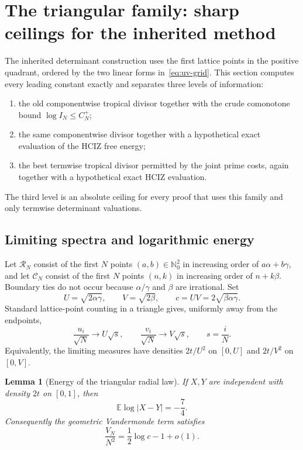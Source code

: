 \documentclass[11pt]{article}
\newcommand{\Nzero}{\mathbb N_0}
\newcommand{\E}{\mathbb E}
\newcommand{\1}{\mathbf 1}
\theoremstyle{plain}
\newtheorem{lemma}[theorem]{Lemma}
\theoremstyle{definition}
\theoremstyle{remark}
\begin{document}
\section{The triangular family: sharp ceilings for the inherited method}
\label{sec:triangular}

The inherited determinant construction uses the first lattice points in the
positive quadrant, ordered by the two linear forms in~\eqref{eq:uv-grid}.
This section computes every leading constant exactly and separates three
levels of information:
\begin{enumerate}[label=(\roman*),leftmargin=2.2em]
\item the old componentwise tropical divisor together with the crude
      comonotone bound $\log I_N\le C_N^+$;
\item the same componentwise divisor together with a hypothetical exact
      evaluation of the HCIZ free energy;
\item the best termwise tropical divisor permitted by the joint prime costs,
      again together with a hypothetical exact HCIZ evaluation.
\end{enumerate}
The third level is an absolute ceiling for every proof that uses this family
and only termwise determinant valuations.

\subsection{Limiting spectra and logarithmic energy}

Let $\mathcal R_N$ consist of the first $N$ points $(a,b)\in\Nzero^2$ in
increasing order of $a\alpha+b\gamma$, and let $\mathcal C_N$ consist of the
first $N$ points $(n,k)$ in increasing order of $n+k\beta$.  Boundary ties do
not occur because $\alpha/\gamma$ and $\beta$ are irrational.  Set
\begin{equation}\label{eq:UVc}
 U=\sqrt{2\alpha\gamma},\qquad
 V=\sqrt{2\beta},\qquad
 c=UV=2\sqrt{\beta\alpha\gamma}.
\end{equation}
Standard lattice-point counting in a triangle gives, uniformly away from the
endpoints,
\begin{equation}\label{eq:triangular-quantiles}
 \frac{u_i}{\sqrt N}\longrightarrow U\sqrt{s},\qquad
 \frac{v_i}{\sqrt N}\longrightarrow V\sqrt{s},
 \qquad s=\frac{i}{N}.
\end{equation}
Equivalently, the limiting measures have densities
$2t/U^2$ on $[0,U]$ and $2t/V^2$ on $[0,V]$.

\begin{lemma}[Energy of the triangular radial law]\label{lem:tri-energy}
If $X,Y$ are independent with density $2t$ on $[0,1]$, then
\begin{equation}\label{eq:tri-energy}
 \E\log|X-Y|=-\frac74.
\end{equation}
Consequently the geometric Vandermonde term satisfies
\begin{equation}\label{eq:tri-V}
 \frac{V_N}{N^2}=\frac12\log c-1+o(1).
\end{equation}
\end{lemma}
\end{document}
